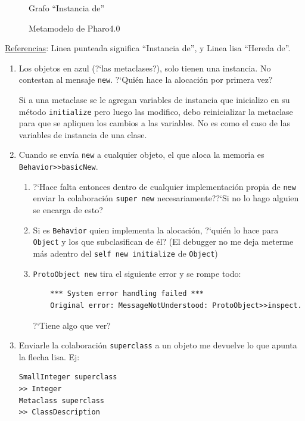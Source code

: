 \begin{figure}[H]
\begin{minipage}{.5\textwidth}
  \caption{Grafo ``Instancia de''}
  \label{fig:sub2}
\end{minipage}
\caption{Metamodelo de Pharo4.0}
\label{fig:test}
\end{figure}

\underline{Referencias}: Linea punteada significa ``Instancia de'', y Linea lisa ``Hereda de''.

\begin{enumerate}
 \item Los objetos en azul (?`las metaclases?), solo tienen una instancia. No contestan al mensaje \texttt{new}. ?`Qui\'en hace la alocaci\'on por primera vez? 
 
 Si a una metaclase se le agregan variables de instancia que inicializo en su m\'etodo \texttt{initialize} pero luego las modifico, debo reinicializar la metaclase para que se apliquen los cambios a las variables. No es como el caso de las variables de instancia de una clase. 
 
 \item Cuando se env\'ia \texttt{new} a cualquier objeto, el que aloca la memoria es \texttt{Behavior>>basicNew}. 
  \begin{enumerate}
    \item ?`Hace falta entonces dentro de cualquier implementaci\'on propia de \texttt{new} enviar la colaboraci\'on \texttt{super new} necesariamente??`Si no lo hago alguien se encarga de esto? 
    \item Si es \texttt{Behavior} quien implementa la alocaci\'on, ?`qui\'en lo hace para \texttt{Object} y los que subclasifican de \'el? (El debugger no me deja meterme m\'as adentro del \texttt{self new initialize} de \texttt{Object})
    
     \item \texttt{ProtoObject new} tira el siguiente error y se rompe todo: 

	\begin{verbatim}
	*** System error handling failed ***
	Original error: MessageNotUnderstood: ProtoObject>>inspect.
	\end{verbatim}

	?`Tiene algo que ver?
    
  \end{enumerate}

 \item Enviarle la colaboraci\'on \texttt{superclass} a un objeto me devuelve lo que apunta la flecha lisa. Ej: 
\begin{verbatim}
SmallInteger superclass
>> Integer
Metaclass superclass
>> ClassDescription
\end{verbatim}


\end{enumerate}
